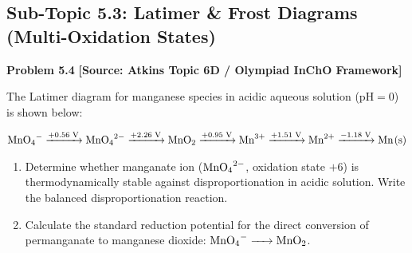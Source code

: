 \subsection{Sub-Topic 5.3: Latimer \& Frost Diagrams (Multi-Oxidation States)}

\begin{problembox}
\textbf{Problem 5.4} \hfill \textbf{[Source: Atkins Topic 6D / Olympiad InChO Framework]}

The Latimer diagram for manganese species in acidic aqueous solution ($\text{pH} = 0$) is shown below:
\begin{center}
$\ce{MnO4-} \xrightarrow{+0.56\text{ V}} \ce{MnO4^2-} \xrightarrow{+2.26\text{ V}} \ce{MnO2} \xrightarrow{+0.95\text{ V}} \ce{Mn^3+} \xrightarrow{+1.51\text{ V}} \ce{Mn^2+} \xrightarrow{-1.18\text{ V}} \ce{Mn(s)}$
\end{center}
\begin{enumerate}[label=(\alph*)]
    \item Determine whether manganate ion ($\ce{MnO4^2-}$, oxidation state $+6$) is thermodynamically stable against disproportionation in acidic solution. Write the balanced disproportionation reaction.
    \item Calculate the standard reduction potential for the direct conversion of permanganate to manganese dioxide: $\ce{MnO4- -> MnO2}$.
\end{enumerate}
\end{problembox}
